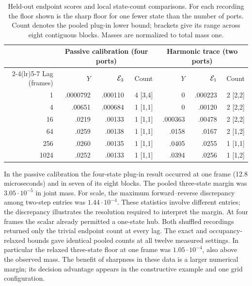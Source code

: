 \begin{table}[htbp]
\centering\small
\caption{Held-out endpoint scores and local state-count comparisons. For each recording the floor shown is the sharp floor for one fewer state than the number of ports. Count denotes the pooled plug-in lower bound; brackets give its range across eight contiguous blocks. Masses are normalized to total mass one.}
\label{tab:measured}
\begin{tabular}{r rrr rrr}
\toprule
 & \multicolumn{3}{c}{Passive calibration (four ports)} & \multicolumn{3}{c}{Harmonic trace (two ports)}\\
\cmidrule(lr){2-4}\cmidrule(lr){5-7}
Lag (frames) & \(Y\) & \(\mathcal E_3\) & Count & \(Y\) & \(\mathcal E_1\) & Count\\
\midrule
1    & .0000792 & .000110 & 4 [3,4] & 0       & .000223 & 2 [2,2]\\
4    & .00651   & .000684 & 1 [1,1] & 0       & .00120  & 2 [2,2]\\
16   & .0219    & .00133  & 1 [1,1] & .000363 & .00478  & 2 [2,2]\\
64   & .0259    & .00138  & 1 [1,1] & .0158   & .0167   & 2 [1,2]\\
256  & .0260    & .00135  & 1 [1,1] & .0405   & .0255   & 1 [1,1]\\
1024 & .0252    & .00133  & 1 [1,1] & .0394   & .0256   & 1 [1,2]\\
\bottomrule
\end{tabular}
\end{table}

In the passive calibration the four-state plug-in result occurred at one frame (12.8 microseconds) and in seven of its eight blocks. The pooled three-state margin was \(3.05\cdot10^{-5}\) in joint mass. For scale, the maximum forward--reverse discrepancy among two-step entries was \(1.44\cdot10^{-4}\). These statistics involve different entries; the discrepancy illustrates the resolution required to interpret the margin. At four frames the scalar already permitted a one-state hub. Both shuffled recordings returned only the trivial endpoint count at every lag. The exact and occupancy-relaxed bounds gave identical pooled counts at all twelve measured settings. In particular the relaxed three-state floor at one frame was \(1.05\cdot10^{-4}\), also above the observed mass. The benefit of sharpness in these data is a larger numerical margin; its decision advantage appears in the constructive example and one grid configuration.

